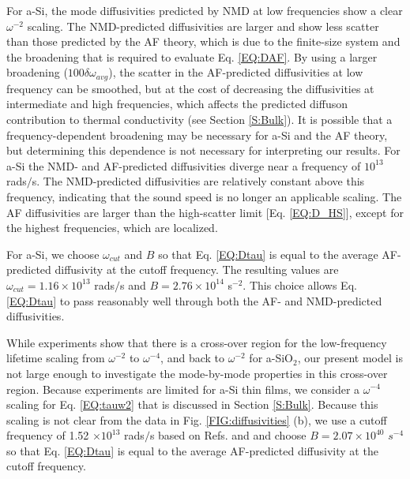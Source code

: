 \documentclass[aps,prb,onecolumn,preprint,superscriptaddress,footinbib,amsmath,amssymb,floatfix]{revtex4}
\begin{document}
For a-Si, the mode diffusivities predicted by NMD at 
low frequencies show a clear $\omega^{-2}$ scaling. 
The NMD-predicted diffusivities are larger and show less 
scatter than those predicted by the AF theory, which is due to 
the finite-size system and the broadening that is 
required to evaluate 
Eq. \eqref{EQ:DAF}.\cite{feldman_thermal_1993} By using a larger 
broadening ($100\delta\omega_{avg}$), the scatter 
in the AF-predicted 
diffusivities at low frequency can be smoothed, but at the cost of 
decreasing the diffusivities at intermediate and 
high frequencies, which 
affects the predicted diffuson contribution to thermal 
conductivity (see Section \ref{S:Bulk}). 
It is possible that a frequency-dependent broadening may be 
necessary for a-Si and the AF theory,  
but determining this dependence is not necessary for 
interpreting our results. 
For a-Si the NMD- and AF-predicted diffusivities diverge 
near a frequency of $10^{13}$ rads$/$s. The NMD-predicted 
diffusivities are relatively constant above this frequency, 
indicating that the sound speed is no longer 
an applicable scaling. The AF diffusivities are 
larger than the high-scatter limit [Eq. \eqref{EQ:D_HS}], 
except for the highest frequencies, which are localized.
\cite{feldman_thermal_1993} 

For a-Si, we choose $\omega_{cut}$  
and $B$ so that Eq. \eqref{EQ:Dtau} is equal 
to the average AF-predicted diffusivity at the cutoff frequency. 
The resulting values are 
$\omega_{cut}=1.16 \times 10^{13}$ rads$/$s 
and $B=2.76\times10^{14}$ s$^{-2}$. This choice 
allows Eq. \eqref{EQ:Dtau} to pass reasonably well through both 
the AF- and NMD-predicted diffusivities. 

While experiments show that there is a cross-over region for the 
low-frequency lifetime scaling from $\omega^{-2}$ to 
$\omega^{-4}$,\cite{masciovecchio_evidence_2006} 
and back to $\omega^{-2}$ for a-SiO$_2$,
\cite{masciovecchio_evidence_2006,baldi_sound_2010,
baldi_elastic_2011,baldi_emergence_2013} our present model is not 
large enough to investigate the mode-by-mode properties 
in this cross-over region. 
Because experiments are limited for a-Si thin films, 
\cite{hondongwa_ultrasonic_2011} 
we consider a $\omega^{-4}$ scaling 
for Eq. \eqref{EQ:tauw2} that is discussed in 
Section \ref{S:Bulk}. Because this scaling is not clear from 
the data in Fig. \ref{FIG:diffusivities} (b),  
we use a cutoff frequency of 1.52 $\times 10^{13}$ rads$/$s  
based on Refs.  and 
and choose $B=2.07\times10^{40}$ $s^{-4}$ so that 
Eq. \eqref{EQ:Dtau} is equal to the average 
AF-predicted diffusivity at the cutoff frequency. 
\end{document}
